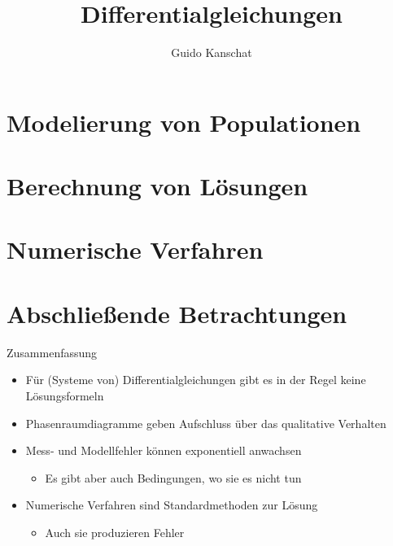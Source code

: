 \documentclass[notheorems,hidelinks,aspectratio=1610]{beamer}
\title{Differentialgleichungen}
\author{Guido Kanschat}
\date{}
\begin{document}
\frame{\maketitle}

\section{Modelierung von Populationen}
\frame{\sectoc}



\section{Berechnung von Lösungen}
\frame{\sectoc}



\section{Numerische Verfahren}
\frame{\sectoc}



\section{Abschließende Betrachtungen}
\frame{\sectoc}

\begin{frame}{Zusammenfassung}
  \begin{itemize}
  \item Für (Systeme von) Differentialgleichungen gibt es in der Regel
    keine Lösungsformeln
  \item Phasenraumdiagramme geben Aufschluss über das qualitative
    Verhalten
  \item Mess- und Modellfehler können exponentiell anwachsen
    \begin{itemize}
    \item Es gibt aber auch Bedingungen, wo sie es nicht tun
    \end{itemize}
  \item Numerische Verfahren sind Standardmethoden zur Lösung
    \begin{itemize}
    \item Auch sie produzieren Fehler
    \end{itemize}
  \end{itemize}
\end{frame}
\end{document}
